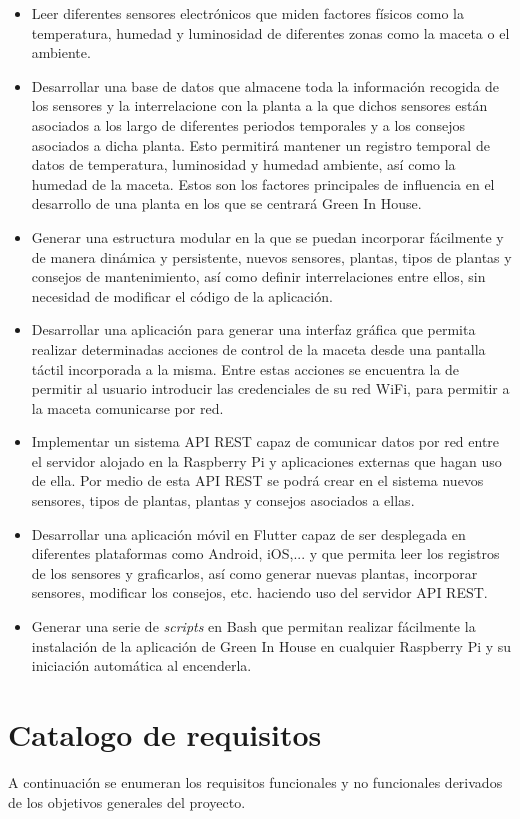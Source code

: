 \begin{itemize}
    \item Leer diferentes sensores electrónicos que miden factores físicos como la temperatura, humedad y luminosidad de diferentes zonas como la maceta o el ambiente.
    \item Desarrollar una base de datos que almacene toda la información recogida de los sensores y la interrelacione con la planta a la que dichos sensores están asociados a los largo de diferentes periodos temporales y a los consejos asociados a dicha planta. Esto permitirá mantener un registro temporal de datos de temperatura, luminosidad y humedad ambiente, así como la humedad de la maceta. Estos son los factores principales de influencia en el desarrollo de una planta en los que se centrará Green In House.
    \item Generar una estructura modular en la que se puedan incorporar fácilmente y de manera dinámica y persistente, nuevos sensores, plantas, tipos de plantas y consejos de mantenimiento, así como definir interrelaciones entre ellos, sin necesidad de modificar el código de la aplicación.
    \item Desarrollar una aplicación para generar una interfaz gráfica que permita realizar determinadas acciones de control de la maceta desde una pantalla táctil incorporada a la misma. Entre estas acciones se encuentra la de permitir al usuario introducir las credenciales de su red WiFi, para permitir a la maceta comunicarse por red.
    \item Implementar un sistema API REST capaz de comunicar datos por red entre el servidor alojado en la Raspberry Pi y aplicaciones externas que hagan uso de ella. Por medio de esta API REST se podrá crear en el sistema nuevos sensores, tipos de plantas, plantas y consejos asociados a ellas.
    \item Desarrollar una aplicación móvil en Flutter capaz de ser desplegada en diferentes plataformas como Android, iOS,... y que permita leer los registros de los sensores y graficarlos, así como generar nuevas plantas, incorporar sensores, modificar los consejos, etc. haciendo uso del servidor API REST.
    \item Generar una serie de \textit{scripts} en Bash que permitan realizar fácilmente la instalación de la aplicación de Green In House en cualquier Raspberry Pi y su iniciación automática al encenderla.
\end{itemize}

\section{Catalogo de requisitos}
A continuación se enumeran los requisitos funcionales y no funcionales derivados de los objetivos generales del proyecto.

